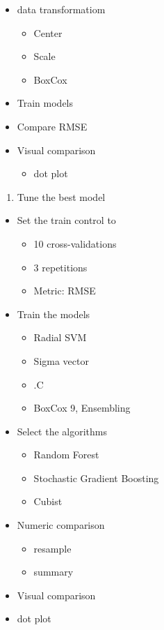 \documentclass[]{book}
\providecommand{\tightlist}{%
  \setlength{\itemsep}{0pt}\setlength{\parskip}{0pt}}
\begin{document}
\begin{itemize}
\tightlist
\item
  data transformatiom

  \begin{itemize}
  \tightlist
  \item
    Center
  \item
    Scale
  \item
    BoxCox
  \end{itemize}
\item
  Train models
\item
  Compare RMSE
\item
  Visual comparison

  \begin{itemize}
  \tightlist
  \item
    dot plot
  \end{itemize}
\end{itemize}

\begin{enumerate}
\def\labelenumi{\arabic{enumi}.}
\setcounter{enumi}{7}
\tightlist
\item
  Tune the best model
\end{enumerate}

\begin{itemize}
\tightlist
\item
  Set the train control to

  \begin{itemize}
  \tightlist
  \item
    10 cross-validations
  \item
    3 repetitions
  \item
    Metric: RMSE
  \end{itemize}
\item
  Train the models

  \begin{itemize}
  \tightlist
  \item
    Radial SVM
  \item
    Sigma vector
  \item
    .C
  \item
    BoxCox
    9, Ensembling
  \end{itemize}
\item
  Select the algorithms

  \begin{itemize}
  \tightlist
  \item
    Random Forest
  \item
    Stochastic Gradient Boosting
  \item
    Cubist
  \end{itemize}
\item
  Numeric comparison

  \begin{itemize}
  \tightlist
  \item
    resample
  \item
    summary
  \end{itemize}
\item
  Visual comparison
\item
  dot plot
\end{itemize}
\end{document}
